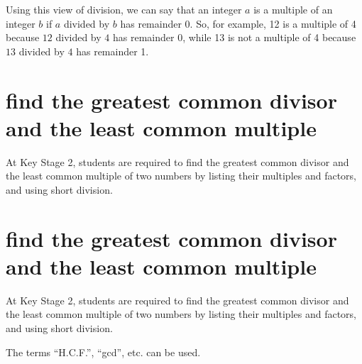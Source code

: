 Using this view of division, we can say that an integer $a$ is a multiple of an integer $b$ if $a$ divided by $b$ has remainder 0. So, for example, 12 is a multiple of 4 because $12$ divided by $4$ has remainder 0, while 13 is not a multiple of 4 because $13$ divided by $4$ has remainder 1.
\section{find the greatest common divisor and the least
common multiple}

At Key Stage 2, students are required to find
the greatest common divisor and the least
common multiple of two numbers by listing
their multiples and factors, and using short
division.

\section{find the greatest common divisor and the least
common multiple}

At Key Stage 2, students are required to find
the greatest common divisor and the least
common multiple of two numbers by listing
their multiples and factors, and using short
division.



The terms “H.C.F.”, “gcd”, etc. can be used.







\section{}








\section{}

















\section{}













